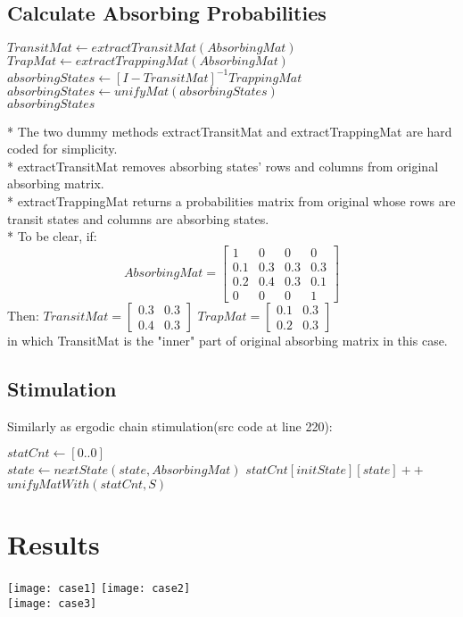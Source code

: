 \documentclass[11pt,letterpaper]{article}
\begin{document}
\subsection{Calculate Absorbing Probabilities}
\begin{algorithmic}
\State $TransitMat \gets extractTransitMat(AbsorbingMat)$
\State $TrapMat \gets extractTrappingMat(AbsorbingMat)$
\State $absorbingStates \gets [I-TransitMat]^{-1}TrappingMat$
\State $absorbingStates \gets unifyMat(absorbingStates)$\\
\Return $absorbingStates$
\EndFunction
\end{algorithmic}
* The two dummy methods extractTransitMat and extractTrappingMat are hard coded for simplicity.\\
* extractTransitMat removes absorbing states' rows and columns from original absorbing matrix.\\
* extractTrappingMat returns a probabilities matrix from original whose rows are transit states and columns are absorbing states.\\
* To be clear, if:
$$AbsorbingMat=\left[\begin{array}{cccc}1 & 0 & 0 & 0 \\0.1 & 0.3 & 0.3 & 0.3 \\0.2 & 0.4 & 0.3 & 0.1 \\0 & 0 & 0 & 1\end{array}\right]$$
Then: $TransitMat=\left[\begin{array}{cc}0.3 & 0.3 \\0.4 & 0.3\end{array}\right]$
$TrapMat=\left[\begin{array}{cc}0.1 & 0.3 \\0.2 & 0.3\end{array}\right]$\\
in which TransitMat is the "inner" part of original absorbing matrix in this case.
\subsection{Stimulation}
Similarly as ergodic chain stimulation(src code at line 220):
\begin{algorithmic}
\State $statCnt \gets [0..0]$
		\Repeat \\
			\indent \indent \indent \indent $state \gets nextState(state, AbsorbingMat)$
		$statCnt[initState][state]++$
	\EndFor
\EndFor \\
\indent \Return $unifyMatWith(statCnt,S)$
\EndFunction
\end{algorithmic}
\section{Results}
\texttt{[image: case1]}
\newpage
\texttt{[image: case2]}\\
\texttt{[image: case3]}
\end{document}
